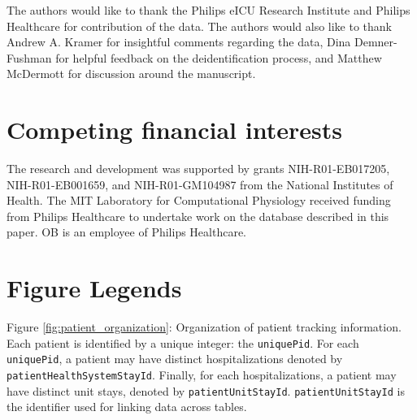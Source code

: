 \documentclass[english]{article}
\newcommand{\colname}[1]{\texttt{#1}}
\begin{document}
The authors would like to thank the Philips eICU Research Institute and
Philips Healthcare for contribution of the data. The authors would also like to thank Andrew A. Kramer for insightful comments regarding the data, Dina Demner-Fushman for helpful feedback on the deidentification process, and Matthew McDermott for discussion around the manuscript.

\section*{Competing financial interests}\label{competing-interests}

The research and development was supported by grants NIH-R01-EB017205, NIH-R01-EB001659, and NIH-R01-GM104987 from the National Institutes of Health. The MIT Laboratory for Computational Physiology received funding from Philips Healthcare to undertake work on the database described in this paper. OB is an employee of Philips Healthcare.

\section*{Figure Legends}



\noindent
Figure \ref{fig:patient_organization}: Organization of patient tracking information. Each patient is identified by a unique integer: the \colname{uniquePid}. For each \colname{uniquePid}, a patient may have distinct hospitalizations denoted by \colname{patientHealthSystemStayId}. Finally, for each hospitalizations, a patient may have distinct unit stays, denoted by \colname{patientUnitStayId}. \colname{patientUnitStayId} is the identifier used for linking data across tables.\\
\end{document}
